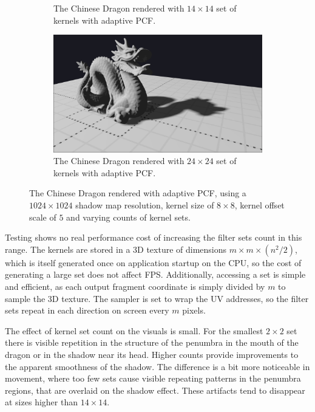 \begin{figure}[h]
\begin{subfigure}[t]{0.45\textwidth}
        \caption{The Chinese Dragon rendered with \(14\times 14\) set of kernels with adaptive PCF.}
    \end{subfigure}
	\hfill
    \begin{subfigure}[t]{0.45\textwidth}
		\centering
        \includegraphics[width=\textwidth]{./graf/tests/adaptive/cropped/dragon_adaptive_fhd_1024_24x24_8x8_offset5.png}
        \caption{The Chinese Dragon rendered with \(24\times 24\) set of kernels with adaptive PCF.}
    \end{subfigure}

    \caption{The Chinese Dragon rendered with adaptive PCF, using a \(1024\times 1024\) shadow map resolution, kernel size of \(8\times 8\), kernel offset scale of \(5\) and varying counts of kernel sets.}
    \label{fig:test_adaptive_sets_dragon_screens}
\end{figure}

Testing shows no real performance cost of increasing the filter sets count in this range. The kernels are stored in a 3D texture of dimensions \(m\times m \times (n^2/2) \), which is itself generated once on application startup on the CPU, so the cost of generating a large set does not affect FPS. Additionally, accessing a set is simple and efficient, as each output fragment coordinate is simply divided by \(m\) to sample the 3D texture. The sampler is set to wrap the UV addresses, so the filter sets repeat in each direction on screen every \(m\) pixels.

The effect of kernel set count on the visuals is small. For the smallest \(2\times 2\) set there is visible repetition in the structure of the penumbra in the mouth of the dragon or in the shadow near its head. Higher counts provide improvements to the apparent smoothness of the shadow. The difference is a bit more noticeable in movement, where too few sets cause visible repeating patterns in the penumbra regions, that are overlaid on the shadow effect. These artifacts tend to disappear at sizes higher than \(14\times 14\).

